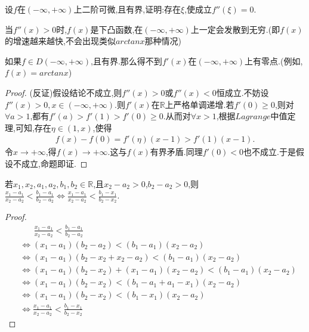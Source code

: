\documentclass[lang=cn,newtx,10pt,scheme=chinese]{elegantbook}
\begin{document}
\begin{proposition}\label{pro:二阶导数零点的存在性}
    设\(f\)在\((-\infty,+\infty)\)上二阶可微,且有界,证明:存在\(\xi\),使成立\(f''(\xi)=0\).
\end{proposition}
\begin{note}
    当$f''(x)>0$时,$f(x)$是下凸函数,在$(-\infty,+\infty)$上一定会发散到无穷.(即$f(x)$的增速越来越快,不会出现类似$arctanx$那种情况)
\end{note}
\begin{remark}
    如果$f\in D(-\infty,+\infty)$,且有界.那么得不到$f'(x)$在$(-\infty,+\infty)$上有零点.(例如,$f(x)=arctanx$)
\end{remark}
\begin{proof}
    (反证)假设结论不成立,则$f''(x)>0$或$f''(x)<0$恒成立.不妨设$f''(x)>0,x\in (-\infty,+\infty)$.则$f'(x)$在$\mathbb{R}$上严格单调递增.若$f'(0)\ge0$,则对$\forall a>1$,都有$f'(a)>f'(1)>f'(0)\ge0$.从而对$\forall x>1$,根据$Lagrange$中值定理,可知,存在$\eta \in (1,x)$,使得
    \begin{align*}
        f(x)-f(0)=f'(\eta)(x-1)>f'(1)(x-1).
    \end{align*}
    令$x\to +\infty$,得$f(x)\to +\infty$.这与$f(x)$有界矛盾.同理$f'(0)<0$也不成立.于是假设不成立,命题即证.
\end{proof}

\begin{proposition}\label{pro:分式不等式等价变形}
    若\(x_1,x_2,a_1,a_2,b_1,b_2\in \mathbb{R}\),且\(x_2 - a_2 > 0\),\(b_2 - a_2 > 0\),则\(\frac{x_1 - a_1}{x_2 - a_2} < \frac{b_1 - a_1}{b_2 - a_2} \Leftrightarrow \frac{x_1 - a_1}{x_2 - a_2} < \frac{b_1 - x_1}{b_2 - x_2}\).
\end{proposition}
\begin{proof}
    \begin{align*}
        &\,\,\,\,\,\,\,\,\,\,\frac{x_1-a_1}{x_2-a_2}<\frac{b_1-a_1}{b_2-a_2}
        \\
        &\Leftrightarrow \left( x_1-a_1 \right) \left( b_2-a_2 \right) <\left( b_1-a_1 \right) \left( x_2-a_2 \right) 
\\
&\Leftrightarrow \left( x_1-a_1 \right) \left( b_2-x_2+x_2-a_2 \right) <\left( b_1-a_1 \right) \left( x_2-a_2 \right) 
\\
&\Leftrightarrow \left( x_1-a_1 \right) \left( b_2-x_2 \right) +\left( x_1-a_1 \right) \left( x_2-a_2 \right) <\left( b_1-a_1 \right) \left( x_2-a_2 \right) 
\\
&\Leftrightarrow \left( x_1-a_1 \right) \left( b_2-x_2 \right) <\left( b_1-a_1+a_1-x_1 \right) \left( x_2-a_2 \right) 
\\
&\Leftrightarrow \left( x_1-a_1 \right) \left( b_2-x_2 \right) <\left( b_1-x_1 \right) \left( x_2-a_2 \right) 
\\
&\Leftrightarrow \frac{x_1-a_1}{x_2-a_2}<\frac{b_1-x_1}{b_2-x_2}
    \end{align*}
\end{proof}
\end{document}
